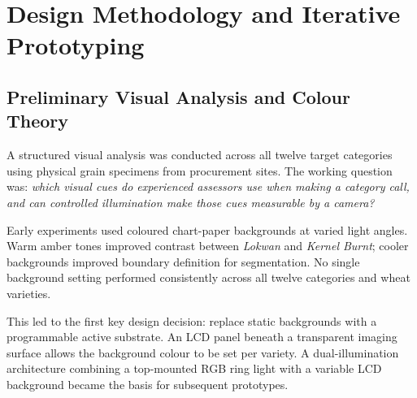 
\chapter{Design Methodology and Iterative Prototyping}\doublespacing
\label{Chapter4}

\section{Preliminary Visual Analysis and Colour Theory}

A structured visual analysis was conducted across all twelve target categories using physical grain specimens from procurement sites. The working question was: \textit{which visual cues do experienced assessors use when making a category call, and can controlled illumination make those cues measurable by a camera?}

Early experiments used coloured chart-paper backgrounds at varied light angles. Warm amber tones improved contrast between \textit{Lokwan} and \textit{Kernel Burnt}; cooler backgrounds improved boundary definition for segmentation. No single background setting performed consistently across all twelve categories and wheat varieties.

This led to the first key design decision: replace static backgrounds with a programmable active substrate. An LCD panel beneath a transparent imaging surface \cite{ElMasry2019} allows the background colour to be set per variety. A dual-illumination architecture combining a top-mounted RGB ring light with a variable LCD background became the basis for subsequent prototypes.

